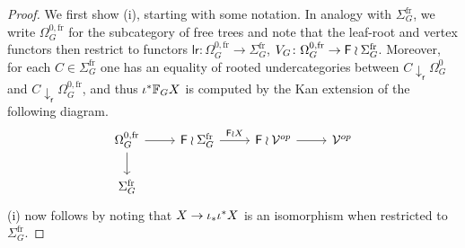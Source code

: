 \documentclass[a4paper,10pt]{article}%
\begin{document}
\begin{proof}
We first show (i), starting with some notation. 
In analogy with $\Sigma_{G}^{\text{fr}}$,
we write $\Omega_{G}^{0,\text{fr}}$ for the subcategory of free trees and note that the leaf-root and vertex functors then restrict to functors
$\mathsf{lr} \colon \Omega_{G}^{0,\text{fr}} \to \Sigma_G^{\text{fr}}$,
$V_G \colon \Omega_{G}^{0,\text{fr}} \to \mathsf{F} \wr \Sigma_G^{\text{fr}}$.
Moreover, for each $C \in \Sigma_G^{\text{fr}}$ one has an equality of rooted undercategories between
$C \downarrow_{\mathsf{r}} \Omega_{G}^0$
and
$C \downarrow_{\mathsf{r}} \Omega_{G}^{0,\text{fr}}$,
and thus 
$\iota^{\**} \mathbb{F}_G X$ is computed by the Kan extension of the following diagram.
\begin{equation}\label{IFGI EQ}
\begin{tikzcd}
	\Omega_{G}^{0,\text{fr}} \ar{d} \ar{r} &
	\Fin \wr \Sigma_G^{\text{fr}} \ar{r}{\Fin \wr X} &
	\Fin \wr \mathcal{V}^{op} \ar{r} &
	\mathcal{V}^{op}
\\
	\Sigma_G^{\text{fr}}
\end{tikzcd}
\end{equation}
(i) now follows by noting that 
$X \to \iota_{\**} \iota^{\**} X$
is an isomorphism when restricted to $\Sigma_G^{\text{fr}}$.


\end{proof}
\end{document}
